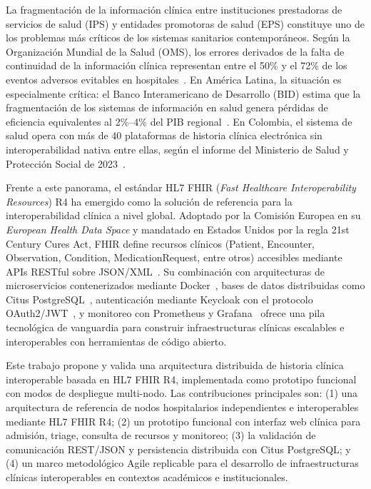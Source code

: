 \documentclass[conference]{IEEEtran}
\begin{document}
La fragmentaci\'on de la informaci\'on cl\'inica entre instituciones
prestadoras de servicios de salud (IPS) y entidades promotoras de salud
(EPS) constituye uno de los problemas m\'as cr\'iticos de los sistemas
sanitarios contempor\'aneos. Seg\'un la Organizaci\'on Mundial de la
Salud (OMS), los errores derivados de la falta de continuidad de la
informaci\'on cl\'inica representan entre el 50\% y el 72\% de los
eventos adversos evitables en hospitales~\cite{bwho}. En Am\'erica
Latina, la situaci\'on es especialmente cr\'itica: el Banco
Interamericano de Desarrollo (BID) estima que la fragmentaci\'on de
los sistemas de informaci\'on en salud genera p\'erdidas de eficiencia
equivalentes al 2\%--4\% del PIB regional~\cite{bbid}. En Colombia,
el sistema de salud opera con m\'as de 40 plataformas de historia
cl\'inica electr\'onica sin interoperabilidad nativa entre ellas,
seg\'un el informe del Ministerio de Salud y Protecci\'on Social
de 2023~\cite{bminsal}.

Frente a este panorama, el est\'andar HL7 FHIR (\textit{Fast Healthcare
Interoperability Resources}) R4 ha emergido como la soluci\'on de
referencia para la interoperabilidad cl\'inica a nivel global. Adoptado
por la Comisi\'on Europea en su \textit{European Health Data Space}
y mandatado en Estados Unidos por la regla 21st Century Cures Act,
FHIR define recursos cl\'inicos (Patient, Encounter, Observation,
Condition, MedicationRequest, entre otros) accesibles mediante APIs
RESTful sobre JSON/XML~\cite{b1}. Su combinaci\'on con arquitecturas
de microservicios contenerizados mediante Docker~\cite{bdocker},
bases de datos distribuidas como Citus PostgreSQL~\cite{b6},
autenticaci\'on mediante Keycloak con el protocolo OAuth2/JWT~\cite{bkeycloak},
y monitoreo con Prometheus y Grafana~\cite{bprom} ofrece una pila
tecnol\'ogica de vanguardia para construir infraestructuras cl\'inicas
escalables e interoperables con herramientas de c\'odigo abierto.

Este trabajo propone y valida una arquitectura distribuida de historia
cl\'inica interoperable basada en HL7 FHIR R4, implementada como
prototipo funcional con modos de despliegue multi-nodo. Las
contribuciones principales son: (1) una arquitectura de referencia de
nodos hospitalarios independientes e interoperables mediante HL7 FHIR
R4; (2) un prototipo funcional con interfaz web cl\'inica para admisi\'on,
triage, consulta de recursos y monitoreo; (3) la validaci\'on de
comunicaci\'on REST/JSON y persistencia distribuida con Citus PostgreSQL;
y (4) un marco metodol\'ogico Agile replicable para el desarrollo de
infraestructuras cl\'inicas interoperables en contextos acad\'emicos
e institucionales.
\end{document}
